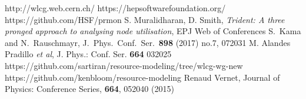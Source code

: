 \begin{thebibliography}{}
http://wlcg.web.cern.ch/
https://hepsoftwarefoundation.org/
https://github.com/HSF/prmon
S. Muralidharan, D. Smith, \textit{Trident: A three pronged approach to analysing node utilisation}, EPJ Web of Conferences
S.~Kama and N.~Rauschmayr, J.\ Phys.\ Conf.\ Ser.\ {\bf 898}
  (2017) no.7, 072031
M. Alandes Pradillo {\em et al}, J. Phys.: Conf. Ser. \textbf{664} 032025
https://github.com/sartiran/resource-modeling/tree/wlcg-wg-new
https://github.com/kenbloom/resource-modeling
Renaud Vernet, Journal of Physics: Conference Series, \textbf{664}, 052040 (2015)
\end{thebibliography}
